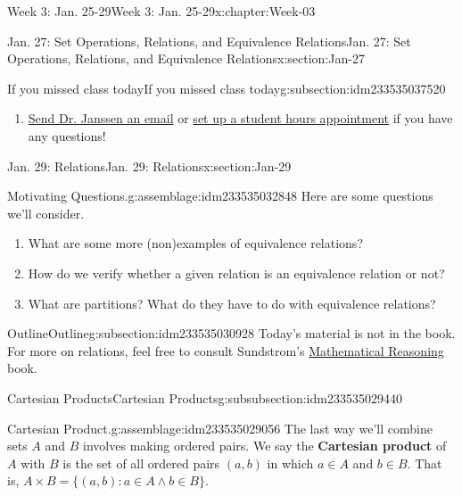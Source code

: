 \documentclass[oneside,10pt,]{book}
\newcommand{\terminology}[1]{\textbf{#1}}
\numberwithin{equation}{section}
\newcommand{\st}{:}
\begin{document}
\begin{chapterptx}{Week 3: Jan. 25-29}{}{Week 3: Jan. 25-29}{}{}{x:chapter:Week-03}
\begin{sectionptx}{Jan. 27: Set Operations, Relations, and Equivalence Relations}{}{Jan. 27: Set Operations, Relations, and Equivalence Relations}{}{}{x:section:Jan-27}
\begin{subsectionptx}{If you missed class today}{}{If you missed class today}{}{}{g:subsection:idm233535037520}
\begin{enumerate}
\item{}\href{mailto:mike.janssen@dordt.edu}{Send Dr. Janssen an email} or \href{https://calendly.com/mkjanssen/student-hours}{set up a student hours appointment} if you have any questions!%
\end{enumerate}
\end{subsectionptx}
\end{sectionptx}
%
%
\typeout{************************************************}
\typeout{************************************************}
%
\begin{sectionptx}{Jan. 29: Relations}{}{Jan. 29: Relations}{}{}{x:section:Jan-29}
\begin{introduction}{}%
\begin{assemblage}{Motivating Questions.}{g:assemblage:idm233535032848}%
Here are some questions we'll consider. %
\begin{enumerate}
\item{}What are some more (non)examples of equivalence relations?%
\item{}How do we verify whether a given relation is an equivalence relation or not?%
\item{}What are partitions? What do they have to do with equivalence relations?%
\end{enumerate}
%
\end{assemblage}
\end{introduction}%
%
%
\typeout{************************************************}
\typeout{************************************************}
%
\begin{subsectionptx}{Outline}{}{Outline}{}{}{g:subsection:idm233535030928}
Today's material is not in the book. For more on relations, feel free to consult Sundstrom's \href{https://www.tedsundstrom.com/mathematical-reasoning-3}{Mathematical Reasoning} book.%
%
%
\typeout{************************************************}
\typeout{************************************************}
%
\begin{subsubsectionptx}{Cartesian Products}{}{Cartesian Products}{}{}{g:subsubsection:idm233535029440}
\begin{assemblage}{Cartesian Product.}{g:assemblage:idm233535029056}%
The last way we'll combine sets \(A\) and \(B\) involves making ordered pairs. We say the \terminology{Cartesian product} of \(A\) with \(B\) is the set of all ordered pairs \((a,b)\) in which \(a\in A\) and \(b\in B\). That is, \(A \times B = \{(a,b) \st a \in A \wedge b \in B\}\).%

\end{assemblage}
\end{subsubsectionptx}
\end{subsectionptx}
\end{sectionptx}
\end{chapterptx}
\end{document}
